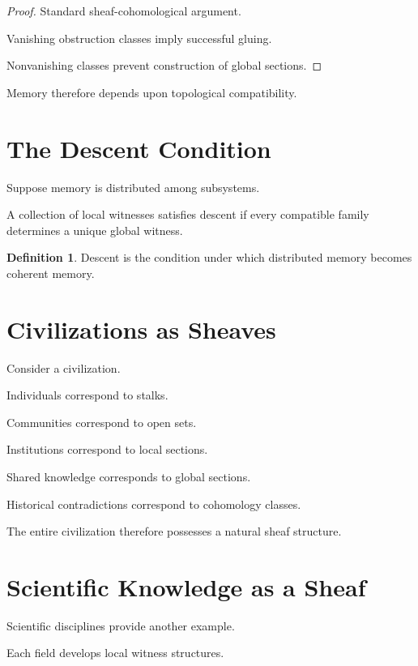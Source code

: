 \documentclass[12pt,oneside]{book}
\theoremstyle{plain} \newtheorem{theorem}{Theorem}[chapter] \newtheorem{lemma}[theorem]{Lemma} \newtheorem{proposition}[theorem]{Proposition} \newtheorem{corollary}[theorem]{Corollary}
\theoremstyle{definition} \newtheorem{definition}[theorem]{Definition} \newtheorem{axiom}[theorem]{Axiom} \newtheorem{construction}[theorem]{Construction}
\theoremstyle{remark} \newtheorem{remark}[theorem]{Remark} \newtheorem{example}[theorem]{Example}
\begin{document}
\begin{proof}

Standard sheaf-cohomological argument.

Vanishing obstruction classes imply successful gluing.

Nonvanishing classes prevent construction of global sections.

\end{proof}

Memory therefore depends upon topological compatibility.

\section{The Descent Condition}

Suppose memory is distributed among subsystems.

A collection of local witnesses satisfies descent if every compatible family determines a unique global witness.

\begin{definition}

Descent is the condition under which distributed memory becomes coherent memory.

\end{definition}

\section{Civilizations as Sheaves}

Consider a civilization.

Individuals correspond to stalks.

Communities correspond to open sets.

Institutions correspond to local sections.

Shared knowledge corresponds to global sections.

Historical contradictions correspond to cohomology classes.

The entire civilization therefore possesses a natural sheaf structure.

\section{Scientific Knowledge as a Sheaf}

Scientific disciplines provide another example.

Each field develops local witness structures.
\end{document}
